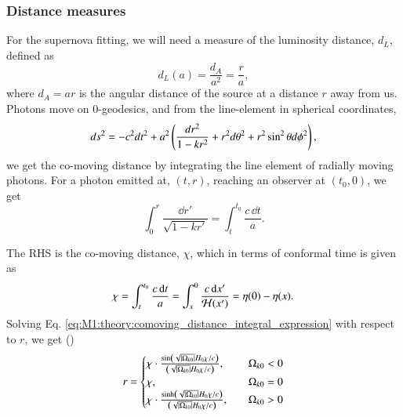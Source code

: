 \subsubsection{Distance measures}

For the supernova fitting, we will need a measure of the luminosity distance, $d_L$, defined as 
%
\begin{equation}
    d_L(a) = \frac{d_A}{a^2} = \frac{r}{a}, \label{eq:m1:theory:dL_of_a_general expression}
\end{equation} 
where $d_A=ar$ is the angular distance of the source at a distance $r$ away from us. Photons move on $0$-geodesics, and from the line-element in spherical coordinates,
\begin{equation}
    ds^2 = -c^2 dt^2 + a^2 \left( \frac{dr^2}{1-kr^2} + r^2 d\theta^2 + r^2 \sin^2\theta d\phi^2 \right), \label{eq:M1:theory:FLRW_general_nonflat_spherical}
\end{equation} 
we get the co-moving distance by integrating the line element of radially moving photons. For a photon emitted at, $(t,r)$, reaching an observer at $(t_0, 0)$, we get 
\begin{equation}
    \int_0^r \frac{\dd r'}{\sqrt{1-k r'}} = \int_t^{t_0} \frac{c\,\dd t}{a}. \label{eq:M1:theory:comoving_distance_integral_expression}
\end{equation} 
%

The RHS is the co-moving distance, $\chi$, which in terms of conformal time is given as  
\begin{equation}
    \chi = \int_t^{t_0} \frac{c\,\dd t}{a} = \int_x^0 \frac{c\,\dd x'}{\mathcal{H}(x')} = \eta(0) - \eta(x). \label{eq:M1:theory:chi_eta0_minus_eta_of_x}
\end{equation}
%
Solving Eq. \eqref{eq:M1:theory:comoving_distance_integral_expression} with respect to $r$, we get ()
\begin{equation}
    r = \begin{cases}
        \chi\cdot \frac{\sin\left( \sqrt{\abs{\Omega_{k0}}} H_0 \chi / c \right)}{\left( \sqrt{\abs{\Omega_{k0}}} H_0 \chi / c \right)},\quad &\Omega_{k0} < 0 \\ 
        \chi,\quad &\Omega_{k0}=0 \\ 
        \chi\cdot \frac{\sinh\left( \sqrt{\abs{\Omega_{k0}}} H_0 \chi / c \right)}{\left( \sqrt{\abs{\Omega_{k0}}} H_0 \chi / c \right)},\quad &\Omega_{k0} > 0
    \end{cases}
\end{equation} 


